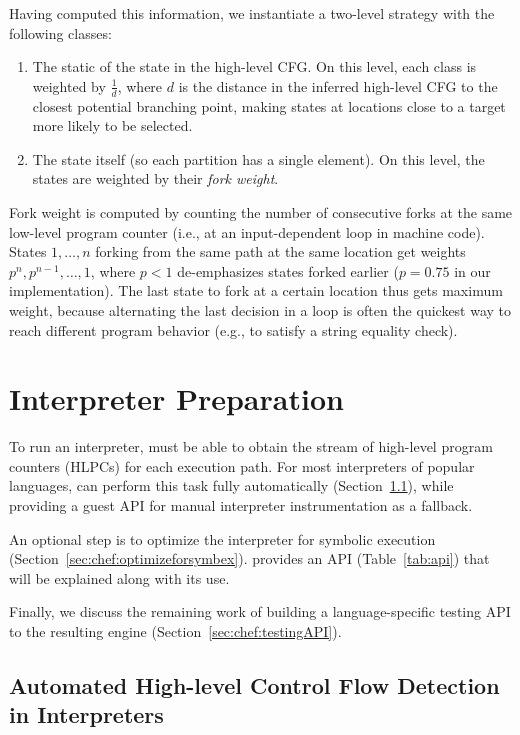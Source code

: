 Having computed this information, we instantiate a two-level \cupa strategy with the following classes:
\begin{enumerate}
\item The static \hlpc of the state in the high-level CFG.  On this level, each class is weighted by $\frac{1}{d}$, where $d$ is the distance in the inferred high-level CFG to the closest potential branching point, making states at locations close to a target more likely to be selected.
\item The state itself (so each partition has a single element).  On this level, the states are weighted by their \textit{fork weight}.
\end{enumerate}

Fork weight is computed by counting the number of consecutive forks at the same low-level program counter (i.e., at an input-dependent loop in machine code).  States $1, \ldots, n$ forking from the same path at the same location get weights $p^n, p^{n-1}, \ldots, 1$, where $p < 1$ de-emphasizes states forked earlier ($p = 0.75$ in our implementation).  The last state to fork at a certain location thus gets maximum weight, because alternating the last decision in a loop is often the quickest way to reach different program behavior (e.g., to satisfy a string equality check).



\section{Interpreter Preparation}
\label{sec:chef:recipe}

To run an interpreter, \chef must be able to obtain the stream of high-level program counters (HLPCs) for each execution path.  For most interpreters of popular languages, \chef can perform this task fully automatically (Section~\ref{sec:chef:hlcf}), while providing a guest API for manual interpreter instrumentation as a fallback.

An optional step is to optimize the interpreter for symbolic execution (Section~\ref{sec:chef:optimizeforsymbex}).  \chef provides an API (Table~\ref{tab:api}) that will be explained along with its use.

Finally, we discuss the remaining work of building a language-specific testing API to the resulting engine (Section~\ref{sec:chef:testingAPI}).


\subsection{Automated High-level Control Flow Detection in Interpreters}
\label{sec:chef:hlcf}

